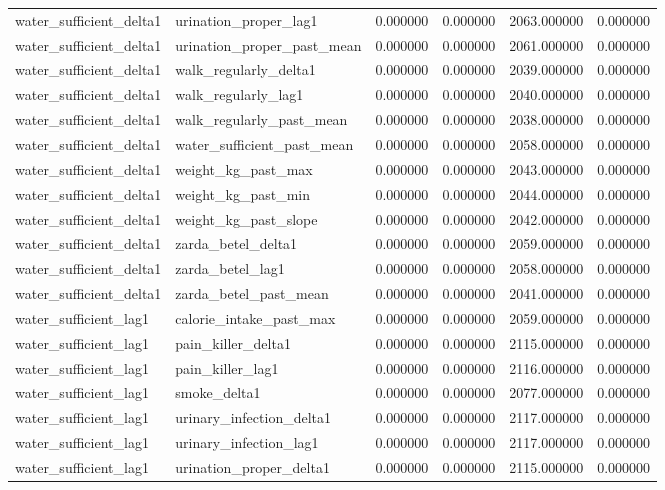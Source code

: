 \begin{longtable}{llrrrr}
water\_sufficient\_delta1 & urination\_proper\_lag1 & 0.000000 & 0.000000 & 2063.000000 & 0.000000 \\
water\_sufficient\_delta1 & urination\_proper\_past\_mean & 0.000000 & 0.000000 & 2061.000000 & 0.000000 \\
water\_sufficient\_delta1 & walk\_regularly\_delta1 & 0.000000 & 0.000000 & 2039.000000 & 0.000000 \\
water\_sufficient\_delta1 & walk\_regularly\_lag1 & 0.000000 & 0.000000 & 2040.000000 & 0.000000 \\
water\_sufficient\_delta1 & walk\_regularly\_past\_mean & 0.000000 & 0.000000 & 2038.000000 & 0.000000 \\
water\_sufficient\_delta1 & water\_sufficient\_past\_mean & 0.000000 & 0.000000 & 2058.000000 & 0.000000 \\
water\_sufficient\_delta1 & weight\_kg\_past\_max & 0.000000 & 0.000000 & 2043.000000 & 0.000000 \\
water\_sufficient\_delta1 & weight\_kg\_past\_min & 0.000000 & 0.000000 & 2044.000000 & 0.000000 \\
water\_sufficient\_delta1 & weight\_kg\_past\_slope & 0.000000 & 0.000000 & 2042.000000 & 0.000000 \\
water\_sufficient\_delta1 & zarda\_betel\_delta1 & 0.000000 & 0.000000 & 2059.000000 & 0.000000 \\
water\_sufficient\_delta1 & zarda\_betel\_lag1 & 0.000000 & 0.000000 & 2058.000000 & 0.000000 \\
water\_sufficient\_delta1 & zarda\_betel\_past\_mean & 0.000000 & 0.000000 & 2041.000000 & 0.000000 \\
water\_sufficient\_lag1 & calorie\_intake\_past\_max & 0.000000 & 0.000000 & 2059.000000 & 0.000000 \\
water\_sufficient\_lag1 & pain\_killer\_delta1 & 0.000000 & 0.000000 & 2115.000000 & 0.000000 \\
water\_sufficient\_lag1 & pain\_killer\_lag1 & 0.000000 & 0.000000 & 2116.000000 & 0.000000 \\
water\_sufficient\_lag1 & smoke\_delta1 & 0.000000 & 0.000000 & 2077.000000 & 0.000000 \\
water\_sufficient\_lag1 & urinary\_infection\_delta1 & 0.000000 & 0.000000 & 2117.000000 & 0.000000 \\
water\_sufficient\_lag1 & urinary\_infection\_lag1 & 0.000000 & 0.000000 & 2117.000000 & 0.000000 \\
water\_sufficient\_lag1 & urination\_proper\_delta1 & 0.000000 & 0.000000 & 2115.000000 & 0.000000 \\

\end{longtable}
